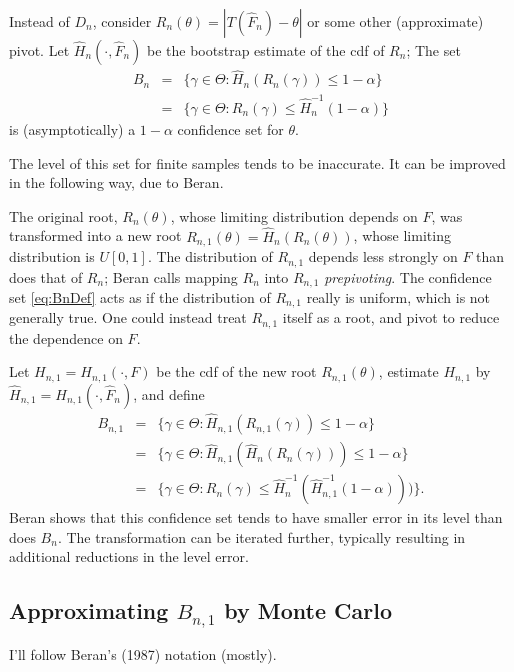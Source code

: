 Instead of $D_n$, consider $R_n(\theta) = | T(\hat{F}_n) - \theta |$ or some
other (approximate) pivot.
Let $\hat{H}_n(\cdot, \hat{F}_n)$ be the bootstrap estimate of the cdf of $R_n$;
The set
\begin{eqnarray}
        B_n &=& \{ \gamma \in \Theta : \hat{H}_n (R_n(\gamma)) \le 1-\alpha \}
            \nonumber \\
        &=& \{ \gamma \in \Theta : R_n(\gamma) \le \hat{H}_n^{-1}(1-\alpha) \}
\label{eq:BnDef}
\end{eqnarray}
is (asymptotically) a $1-\alpha$ confidence set for $\theta$.

The level of this set for finite samples tends to be inaccurate.
It can be improved in the following way, due to Beran.

The original root, $R_n(\theta)$, whose limiting distribution depends on $F$,
was transformed into a new root $R_{n,1}(\theta) = \hat{H}_n(R_n(\theta) )$,
whose limiting distribution is $U[0,1]$.  The distribution of $R_{n,1}$
depends less strongly on $F$ than does that of $R_n$; Beran calls
mapping $R_n$ into $R_{n,1}$  {\em prepivoting}. The confidence set
\ref{eq:BnDef} acts as if the distribution of $R_{n,1}$ really is uniform,
which is not generally true.  One could instead treat $R_{n,1}$ itself as a root,
and pivot to reduce the dependence on $F$.

Let $H_{n,1} = H_{n,1}(\cdot, F)$ be the cdf of the new root $R_{n,1}(\theta)$,
estimate $H_{n,1}$ by $\hat{H}_{n,1} = H_{n,1}(\cdot, \hat{F}_n)$, and define
\begin{eqnarray}
        B_{n,1} &=& \{ \gamma \in \Theta : \hat{H}_{n,1}(R_{n,1}(\gamma)) \le 1-\alpha \}
             \nonumber \\
        &=& \{ \gamma \in \Theta : \hat{H}_{n,1}(\hat{H}_n(R_n(\gamma))) \le 1-\alpha \}
        \nonumber \\
        &=&   \{ \gamma \in \Theta :
                R_n(\gamma) \le \hat{H}_n^{-1}(\hat{H}_{n,1}^{-1}(1-\alpha)))
        \}.
\label{eq:Bn1Def}
\end{eqnarray}
Beran shows that this confidence set tends to have smaller error in its level than
does $B_n$.
The transformation can be iterated further, typically
resulting in additional reductions in the
level error.

\subsection{Approximating $B_{n,1}$ by Monte Carlo}
I'll follow Beran's (1987) notation (mostly).

